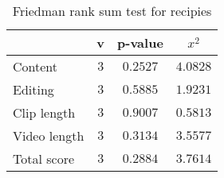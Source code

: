 \begin{table}[ht]
	\begin{center}
	\caption{Friedman rank sum test for recipies}
	\label{tab:fried_recip}
		\begin{tabular}{lccc}
		\toprule
			 & v & p-value & $x^2$\\
			\midrule
			Content & $3$ & $0.2527$ & $4.0828$\\
			Editing & $3$ & $0.5885$ & $1.9231$\\
			Clip length & $3$ & $0.9007$ & $0.5813$\\
			Video length & $3$ & $0.3134$ & $3.5577$\\
			Total score & $3$ & $0.2884$ & $3.7614$\\
		\bottomrule
		\end{tabular}
	\end{center}
\end{table}